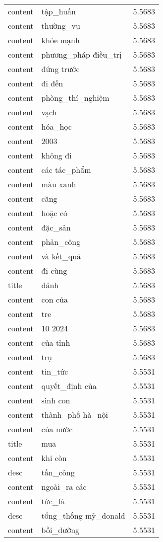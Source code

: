 \documentclass{article}
\begin{document}
\begin{tabular}{lll}
content & tập\_huấn & 5.5683\\
content & thường\_vụ & 5.5683\\
content & khỏe mạnh & 5.5683\\
content & phương\_pháp điều\_trị & 5.5683\\
content & đứng trước & 5.5683\\
content & đi đến & 5.5683\\
content & phòng\_thí\_nghiệm & 5.5683\\
content & vạch & 5.5683\\
content & hóa\_học & 5.5683\\
content & 2003 & 5.5683\\
content & không đi & 5.5683\\
content & các tác\_phẩm & 5.5683\\
content & màu xanh & 5.5683\\
content & căng & 5.5683\\
content & hoặc có & 5.5683\\
content & đặc\_sản & 5.5683\\
content & phản\_công & 5.5683\\
content & và kết\_quả & 5.5683\\
content & đi cùng & 5.5683\\
title & đánh & 5.5683\\
content & con của & 5.5683\\
content & tre & 5.5683\\
content & 10 2024 & 5.5683\\
content & của tỉnh & 5.5683\\
content & trụ & 5.5683\\
content & tin\_tức & 5.5531\\
content & quyết\_định của & 5.5531\\
content & sinh con & 5.5531\\
content & thành\_phố hà\_nội & 5.5531\\
content & của nước & 5.5531\\
title & mua & 5.5531\\
content & khi còn & 5.5531\\
desc & tấn\_công & 5.5531\\
content & ngoài\_ra các & 5.5531\\
content & tức\_là & 5.5531\\
desc & tổng\_thống mỹ\_donald & 5.5531\\
content & bồi\_dưỡng & 5.5531\\

\end{tabular}
\end{document}
